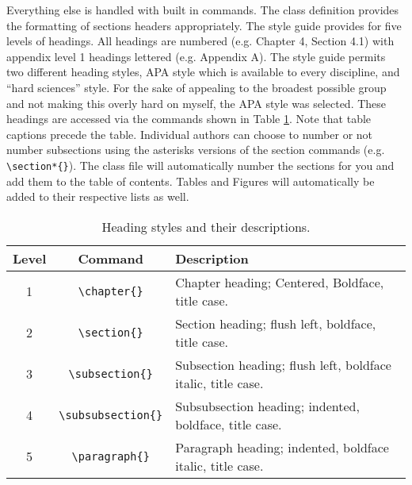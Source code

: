 \documentclass{thesis-dissertation}
\begin{document}
Everything else is handled with built in commands. The class definition provides the formatting of sections headers appropriately. The style guide provides for five levels of headings. All headings are numbered (e.g. Chapter 4, Section 4.1) with appendix level 1 headings lettered (e.g. Appendix A). The style guide permits two different heading styles, APA style which is available to every discipline, and ``hard sciences'' style. For the sake of appealing to the broadest possible group and not making this overly hard on myself, the APA style was selected. These headings are accessed via the commands shown in Table \ref{tab:heading-styles}. Note that table captions precede the table. Individual authors can choose to number or not number subsections using the asterisks versions of the section commands (e.g. \verb|\section*{}|). The class file will automatically number the sections for you and add them to the table of contents. Tables and Figures will automatically be added to their respective lists as well.
\begin{table}[ht]
  \centering
  \caption{Heading styles and their descriptions.}
  \begin{tabular}{|c|c|l|}
    \hline
    \textbf{Level} & \textbf{Command} & \textbf{Description} \\
    \hline
    1 & \verb|\chapter{}| & Chapter heading; Centered, Boldface, title case. \\
    2 & \verb|\section{}| & Section heading; flush left, boldface, title case. \\
    3 & \verb|\subsection{}| & Subsection heading; flush left, boldface italic, title case. \\
    4 & \verb|\subsubsection{}| & Subsubsection heading; indented, boldface, title case. \\
    5 & \verb|\paragraph{}| & Paragraph heading; indented, boldface italic, title case. \\
    \hline
  \end{tabular}
  \label{tab:heading-styles}
\end{table}
\end{document}
